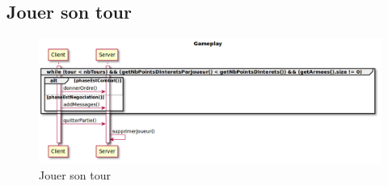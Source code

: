 \subsection{Jouer son tour}
	\vspace{10mm}
	\begin{figure}[!h]
		\centering
		\includegraphics[scale=0.3]{images/DSSGameplay.png}
		\caption{Jouer son tour}
	\end{figure}
	\vspace{70mm}

